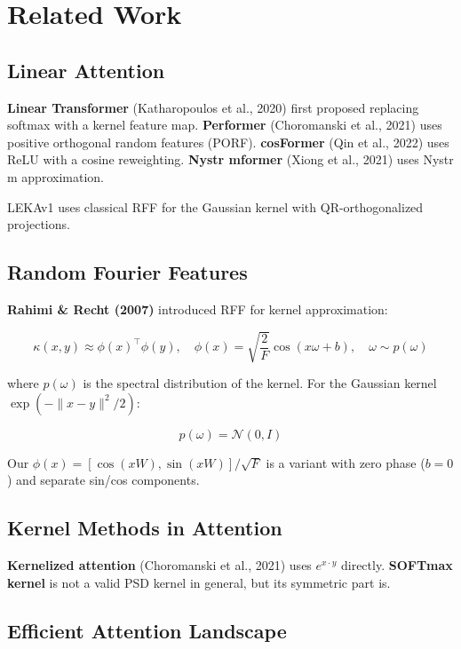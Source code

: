 \section{Related Work}

\subsection{Linear Attention}

\textbf{Linear Transformer} (Katharopoulos et al., 2020) first proposed 
replacing softmax with a kernel feature map. \textbf{Performer} (Choromanski 
et al., 2021) uses positive orthogonal random features (PORF). 
\textbf{cosFormer} (Qin et al., 2022) uses ReLU with a cosine reweighting. 
\textbf{Nystr mformer} (Xiong et al., 2021) uses Nystr m approximation.

LEKAv1 uses classical RFF for the Gaussian kernel with QR-orthogonalized 
projections.

\subsection{Random Fourier Features}

\textbf{Rahimi \& Recht (2007)} introduced RFF for kernel approximation:

\[
\kappa(x, y) \approx \phi(x)^\top \phi(y), \quad
\phi(x) = \sqrt{\frac{2}{F}} \cos(x \omega + b), \quad \omega \sim p(\omega)
\tag{2.1}
\]

where $p(\omega)$ is the spectral distribution of the kernel. For the 
Gaussian kernel $\exp(-\|x - y\|^2 / 2)$:

\[
p(\omega) = \mathcal{N}(0, I)
\tag{2.2}
\]

Our $\phi(x) = [\cos(xW), \sin(xW)]/\sqrt{F}$ is a variant with zero 
phase ($b = 0$) and separate sin/cos components.

\subsection{Kernel Methods in Attention}

\textbf{Kernelized attention} (Choromanski et al., 2021) uses $e^{x \cdot y}$ 
directly. \textbf{SOFTmax kernel} is not a valid PSD kernel in general, but 
its symmetric part is.

\subsection{Efficient Attention Landscape}

